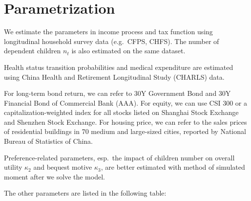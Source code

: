 \documentclass[
  12pt,
]{article}
\begin{document}
\hypertarget{parametrization}{%
\section{Parametrization}\label{parametrization}}

We estimate the parameters in income process and tax function using
longitudinal household survey data (e.g.~CFPS, CHFS). The number of
dependent children \(n_t\) is also estimated on the same dataset.

Health status transition probabilities and medical expenditure are
estimated using China Health and Retirement Longitudinal Study (CHARLS)
data.

For long-term bond return, we can refer to 30Y Government Bond and 30Y
Financial Bond of Commercial Bank (AAA). For equity, we can use CSI 300
or a capitalization-weighted index for all stocks listed on Shanghai
Stock Exchange and Shenzhen Stock Exchange. For housing price, we can
refer to the sales prices of residential buildings in 70 medium and
large-sized cities, reported by National Bureau of Statistics of China.

Preference-related parameters, esp.~the impact of children number on
overall utility \(\kappa_2\) and bequest motive \(\kappa_3\), are better
estimated with method of simulated moment after we solve the model.

The other parameters are listed in the following table:
\end{document}
